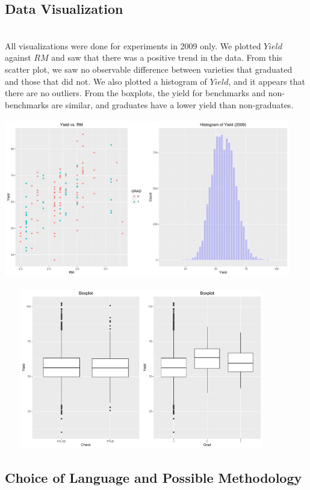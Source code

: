 \documentclass[psamsfonts]{amsart}
\begin{document}
\newpage
\subsection*{Data Visualization}
\hfill \\

All visualizations were done for experiments in 2009 only. We plotted $Yield$ against $RM$ and saw that there was a positive trend in the data.  From this scatter plot, we saw no observable difference between varieties that graduated and those that did not. We also plotted a histogram of $Yield$, and it appears that there are no outliers. From the boxplots, the yield for benchmarks and non-benchmarks are similar, and graduates have a lower yield than non-graduates. \\
\begin{center}
\includegraphics[height = 7cm, width = 12.5cm]{plot1.pdf}
\end{center}
\begin{center}
\includegraphics[height = 7cm, width = 12cm]{boxplot.pdf}
\end{center}

\subsection*{Choice of Language and Possible Methodology}
\hfill \\
\end{document}
